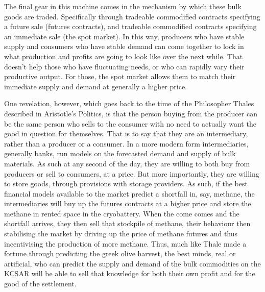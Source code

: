 \documentclass[fleqn,10pt]{Stylesheet} %
\begin{document}
The final gear in this machine comes in the mechanism by which these bulk goods are traded. Specifically through tradeable commodified contracts specifying a future sale (futures contracts), and tradeable commodified contracts specifying an immediate sale (the spot market).
In this way, producers who have stable supply and consumers who have stable demand can come together to lock in what production and profits are going to look like over the next while. That doesn't help those who have fluctuating needs, or who can rapidly vary their productive output. For those, the spot market allows them to match their immediate supply and demand at generally a higher price.

One revelation, however, which goes back to the time of the Philosopher Thales described in Aristotle's Politics\cite{Aristotle4}, is that the person buying from the producer can be the same person who sells to the consumer with no need to actually want the good in question for themselves. That is to say that they are an intermediary, rather than a producer or a consumer. In a more modern form intermediaries, generally banks, run models on the forecasted demand and supply of bulk materials. As such at any second of the day, they are willing to both buy from producers or sell to consumers, at a price. But more importantly, they are willing to store goods, through provisions with storage providers. As such, if the best financial models available to the market predict a shortfall in, say, methane, the intermediaries will buy up the futures contracts at a higher price and store the methane in rented space in the cryobattery. When the come comes and the shortfall arrives, they then sell that stockpile of methane, their behaviour then stabilising the market by driving up the price of methane futures and thus incentivising the production of more methane. Thus, much like Thale made a fortune through predicting the greek olive harvest, the best minds, real or artificial, who can predict the supply and demand of the bulk commodities on the KCSAR will be able to sell that knowledge for both their own profit and for the good of the settlement.
\end{document}
